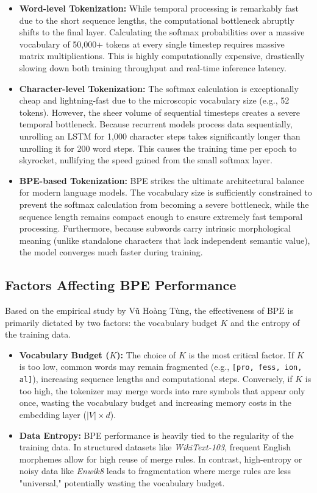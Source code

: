 \begin{itemize}
    \item \textbf{Word-level Tokenization:} While temporal processing is remarkably fast due to the short sequence lengths, the computational bottleneck abruptly shifts to the final layer. Calculating the softmax probabilities over a massive vocabulary of 50,000+ tokens at every single timestep requires massive matrix multiplications. This is highly computationally expensive, drastically slowing down both training throughput and real-time inference latency.
    \item \textbf{Character-level Tokenization:} The softmax calculation is exceptionally cheap and lightning-fast due to the microscopic vocabulary size (e.g., 52 tokens). However, the sheer volume of sequential timesteps creates a severe temporal bottleneck. Because recurrent models process data sequentially, unrolling an LSTM for 1,000 character steps takes significantly longer than unrolling it for 200 word steps. This causes the training time per epoch to skyrocket, nullifying the speed gained from the small softmax layer.
    \item \textbf{BPE-based Tokenization:} BPE strikes the ultimate architectural balance for modern language models. The vocabulary size is sufficiently constrained to prevent the softmax calculation from becoming a severe bottleneck, while the sequence length remains compact enough to ensure extremely fast temporal processing. Furthermore, because subwords carry intrinsic morphological meaning (unlike standalone characters that lack independent semantic value), the model converges much faster during training.
\end{itemize}

\subsection{Factors Affecting BPE Performance}
Based on the empirical study by V\~u Ho\`ang T\`ung, the effectiveness of BPE is primarily dictated by two factors: the vocabulary budget $K$ and the entropy of the training data.

\begin{itemize}
    \item \textbf{Vocabulary Budget ($K$):} The choice of $K$ is the most critical factor. If $K$ is too low, common words may remain fragmented (e.g., \texttt{[pro, fess, ion, al]}), increasing sequence lengths and computational steps. Conversely, if $K$ is too high, the tokenizer may merge words into rare symbols that appear only once, wasting the vocabulary budget and increasing memory costs in the embedding layer ($|V| \times d$).
    \item \textbf{Data Entropy:} BPE performance is heavily tied to the regularity of the training data. In structured datasets like \textit{WikiText-103}, frequent English morphemes allow for high reuse of merge rules. In contrast, high-entropy or noisy data like \textit{Enwik8} leads to fragmentation where merge rules are less "universal," potentially wasting the vocabulary budget.
\end{itemize}

